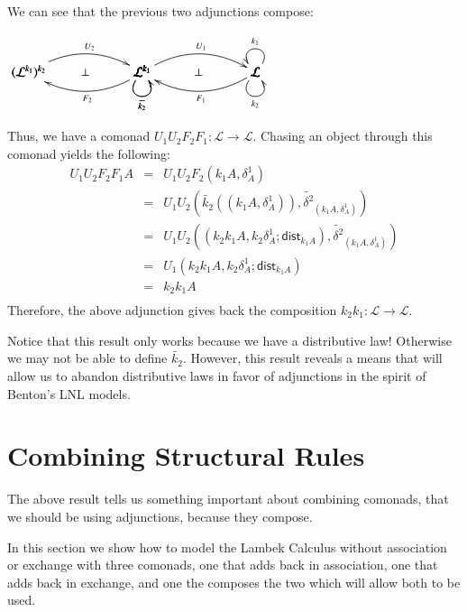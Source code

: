 \documentclass{article}
\let\mto\to
\let\to\relax
\newcommand{\to}{\rightarrow}
\newcommand{\cat}[1]{\mathcal{#1}}
\begin{document}
We can see that the previous two adjunctions compose:
\begin{center}
  \begin{math}
    \bfig
    \Loop(900,0)\cat{L}^{k_1}(dl,dr)_{\widetilde{k_2}}
    \morphism(0,0)|a|/{@{>}@/^1.5em/}/<900,0>[(\cat{L}^{k_1})^{k_2}`\cat{L}^{k_1};U_2]
    \morphism(0,0)|b|/{@{<-}@/_1.5em/}/<900,0>[(\cat{L}^{k_1})^{k_2}`\cat{L}^{k_1};F_2]
    \place(450,0)[\perp]
    
    \Loop(1800,0)\cat{L}(ur,ul)_{k_1}
    \Loop(1800,0)\cat{L}(dl,dr)_{k_2}
    \Loop(900,0)\cat{L}^{k_1}(dl,dr)_{\widetilde{k_2}}
    \morphism(900,0)|a|/{@{>}@/^1.5em/}/<900,0>[\cat{L}^{k_1}`\cat{L};U_1]
    \morphism(900,0)|b|/{@{<-}@/_1.5em/}/<900,0>[\cat{L}^{k_1}`\cat{L};F_1]
    \place(1350,0)[\perp]    
    \efig
  \end{math}
\end{center}
Thus, we have a comonad $U_1U_2F_2F_1 : \cat{L} \mto \cat{L}$.
Chasing an object through this comonad yields the following:
\[
\begin{array}{lll}
  U_1U_2F_2F_1A
  & = & U_1U_2F_2(k_1A,\delta^1_A)\\
  & = & U_1U_2(\widetilde{k_2}((k_1A,\delta^1_A)), \widetilde{\delta^2}_{(k_1A,\delta^1_A)})\\
  & = & U_1U_2((k_2k_1A,k_2\delta^1_A;\mathsf{dist}_{k_1 A}), \widetilde{\delta^2}_{(k_1A,\delta^1_A)})\\
  & = & U_1(k_2k_1A,k_2\delta^1_A;\mathsf{dist}_{k_1 A})\\
  & = & k_2k_1A\\  
\end{array}
\]
Therefore, the above adjunction gives back the composition $k_2k_1 :
\cat{L} \mto \cat{L}$.

Notice that this result only works because we have a distributive law!
Otherwise we may not be able to define $\widetilde{k_2}$.  However,
this result reveals a means that will allow us to abandon distributive
laws in favor of adjunctions in the spirit of Benton's LNL models.


\section{Combining Structural Rules}
\label{sec:combining_structural_rules}
The above result tells us something important about combining
comonads, that we should be using adjunctions, because they compose.

In this section we show how to model the Lambek Calculus without
association or exchange with three comonads, one that adds back in
association, one that adds back in exchange, and one the composes the
two which will allow both to be used.
\end{document}
